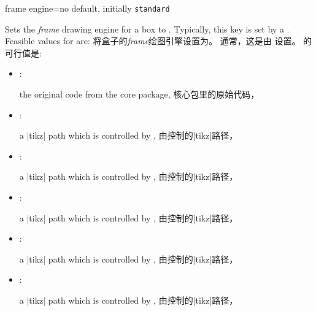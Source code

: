 \begin{docTcbKey}{frame engine}{=}{no default, initially \texttt{standard}}
\begin{stripedbox}
Sets the \emph{frame} drawing engine for a box to .
Typically, this key is set by a .
Feasible values for  are:
\tcblower
将盒子的\emph{frame}绘图引擎设置为。
通常，这是由  设置。
的可行值是:
\end{stripedbox}

\begin{itemize}
  \item{}: 
\begin{stripedbox}
the original code from the core package,
\tcblower
核心包里的原始代码，
\end{stripedbox}
  
  \item{}: 
\begin{stripedbox}
a |tikz| path which is controlled by ,
\tcblower
由控制的|tikz|路径，
\end{stripedbox}

  \item{}:
\begin{stripedbox}
a |tikz| path which is controlled by ,
\tcblower
由控制的|tikz|路径，
\end{stripedbox}

  \item{}:
\begin{stripedbox}
a |tikz| path which is controlled by ,
\tcblower
由控制的|tikz|路径，
\end{stripedbox}

  \item{}: 
\begin{stripedbox}
a |tikz| path which is controlled by ,
\tcblower
由控制的|tikz|路径，
\end{stripedbox}

  \item{}:
\begin{stripedbox}
a |tikz| path which is controlled by ,
\tcblower
由控制的|tikz|路径，
\end{stripedbox}


\end{itemize}
\end{docTcbKey}
